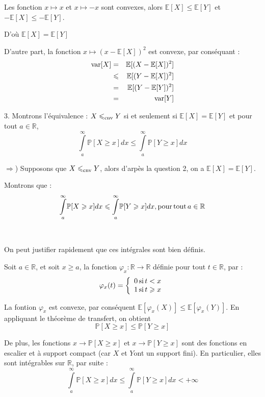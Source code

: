 Les fonction $x \longmapsto x$ et $x \longmapsto - x$ sont convexes, alors
$\mathbb{E} [X] \leqslant \mathbb{E} [Y]$ et $-\mathbb{E} [X] \leqslant
-\mathbb{E} [Y]$.

D'o{\`u} $\mathbb{E} [X] =\mathbb{E} [Y]$

D'autre part, la fonction $x \longmapsto (x -\mathbb{E} [X])^2$ est convexe,
par cons{\'e}quant :
\begin{eqnarray*}
  \operatorname{var} [X] & = & \mathbb{E} [(X -\mathbb{E} [X])^2]\\
  & \leqslant & \mathbb{E} [(Y -\mathbb{E} [X])^2]\\
  & = & \mathbb{E} [(Y -\mathbb{E} [Y])^2]\\
  & = & \operatorname{var} [Y]
\end{eqnarray*}


3. Montrons l'{\'e}quivalence : $X \leqslant_{\operatorname{cnv}} Y$ si et seulement
si $\mathbb{E} [X] =\mathbb{E} [Y]$ et pour tout $a \in \mathbb{R}$,
\[ \underset{a}{\overset{\infty}{\int}} \mathbb{P} [X \geqslant x] d x
   \leqslant \underset{a}{\overset{\infty}{\int}} \mathbb{P} [Y \geqslant x] d
   x \]


$\Rightarrow$) Supposons que $X \leqslant_{\operatorname{cnv}} Y$, alors d'arp{\`e}s
la question 2, on a $\mathbb{E} [X] =\mathbb{E} [Y]$.

Montrons que :
\[ \underset{a}{\overset{\infty}{\int}} \mathbb{P} [X \geqslant x] d x
   \leqslant \underset{a}{\overset{\infty}{\int}} \mathbb{P} [Y \geqslant x] d
   x, \operatorname{pour} \operatorname{tout} a \in \mathbb{R} \]


\

On peut justifier rapidement que ces int{\'e}grales sont bien d{\'e}finis.

Soit $a \in \mathbb{R}$, et soit $x \geqslant a$, la fonction $\varphi_x :
\mathbb{R} \rightarrow \mathbb{R}$ d{\'e}finie pour tout $t \in \mathbb{R}$,
par :
\[ \varphi_x (t) = \left\{\begin{array}{l}
     0 \operatorname{si} t < x\\
     1 \operatorname{si} t \geqslant x
   \end{array}\right. \]


La fontion $\varphi_x$ est convexe, par cons{\'e}quent $\mathbb{E} [\varphi_x
(X)] \leqslant \mathbb{E} [\varphi_x (Y)]$. En appliquant le th{\'e}or{\`e}me
de transfert, on obtient
\[ \mathbb{P} [X \geqslant x] \leqslant \mathbb{P} [Y \geqslant x] \]


De plus, les fonctions $x \rightarrow \mathbb{P} [X \geqslant x]$ et $x
\rightarrow \mathbb{P} [Y \geqslant x]$ sont des fonctions en escalier et
{\`a} support compact (car $X$ et $Y$ont un support fini). En particulier,
elles sont int{\'e}grables sur $\mathbb{R}$, par suite :
\[ \underset{a}{\overset{\infty}{\int}} \mathbb{P} [X \geqslant x] d x
   \leqslant \underset{a}{\overset{\infty}{\int}} \mathbb{P} [Y \geqslant x] d
   x < + \infty \]


